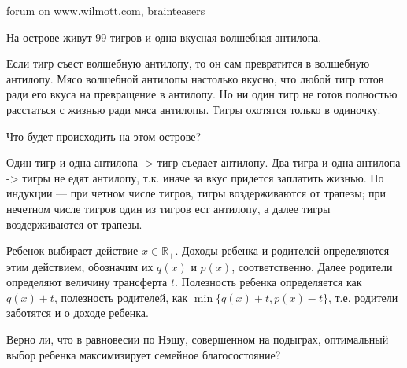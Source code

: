 \begin{problem}
\begin{source}
forum on www.wilmott.com, brainteasers
\end{source}
На острове живут 99 тигров и одна вкусная волшебная антилопа. \par
Если тигр съест волшебную антилопу, то он сам превратится в волшебную антилопу. Мясо волшебной антилопы настолько вкусно, что любой тигр готов ради его вкуса на превращение в антилопу. Но ни один тигр не готов полностью расстаться с жизнью ради мяса антилопы. Тигры охотятся только в одиночку.\par
Что будет происходить на этом острове? \par

\begin{sol}
 Один тигр и одна антилопа -> тигр съедает антилопу. Два тигра и одна антилопа -> тигры не едят антилопу, т.к. иначе за вкус придется заплатить жизнью. По индукции --- при четном числе тигров, тигры воздерживаются от трапезы; при нечетном числе тигров один из тигров ест антилопу, а далее тигры воздерживаются от трапезы.
\end{sol}
\end{problem}





\begin{problem}
 Ребенок выбирает действие $x\in \mathbb{R}_{+}$. Доходы ребенка и
родителей определяются этим действием, обозначим их $q(x)$ и
$p(x)$, соответственно. Далее родители определяют величину
трансферта $t$. Полезность ребенка определяется как $q(x)+t$,
полезность родителей, как $\min\{q(x)+t,p(x)-t\}$, т.е. родители
заботятся и о доходе ребенка. \par
Верно ли, что в равновесии по Нэшу, совершенном на подыграх,
оптимальный выбор ребенка максимизирует семейное благосостояние?



\begin{sol}

\end{sol}
\end{problem}





